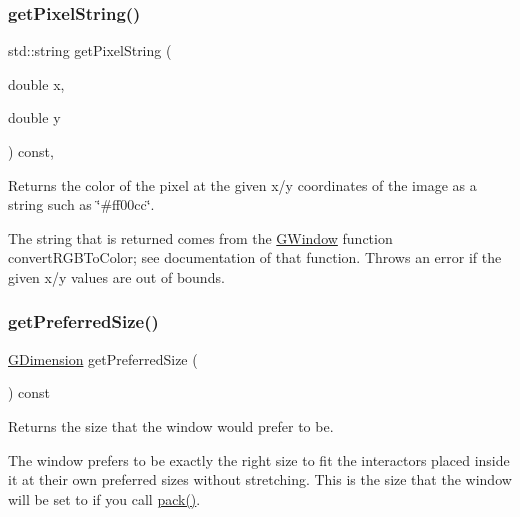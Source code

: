\mbox{\label{classGDrawingSurface_a8da04ef488ec5fa498fbbffaf50928fd}} 
\subsubsection{\texorpdfstring{get\+Pixel\+String()}{getPixelString()}}
{\footnotesize\ttfamily std\+::string get\+Pixel\+String (\begin{DoxyParamCaption}\item[{double}]{x,  }\item[{double}]{y }\end{DoxyParamCaption}) const\hspace{0.3cm}{\ttfamily [virtual]}, {\ttfamily [inherited]}}



Returns the color of the pixel at the given x/y coordinates of the image as a string such as \char`\"{}\#ff00cc\char`\"{}. 

The string that is returned comes from the {\ttfamily \mbox{\hyperlink{classGWindow}{G\+Window}}} function {\ttfamily convert\+R\+G\+B\+To\+Color}; see documentation of that function. Throws an error if the given x/y values are out of bounds. \mbox{\label{classGWindow_a4aabbee761d8e9116275401131b7ccd1}} 
\subsubsection{\texorpdfstring{get\+Preferred\+Size()}{getPreferredSize()}}
{\footnotesize\ttfamily \mbox{\hyperlink{classGDimension}{G\+Dimension}} get\+Preferred\+Size (\begin{DoxyParamCaption}{ }\end{DoxyParamCaption}) const\hspace{0.3cm}{\ttfamily [virtual]}}



Returns the size that the window would prefer to be. 

The window prefers to be exactly the right size to fit the interactors placed inside it at their own preferred sizes without stretching. This is the size that the window will be set to if you call \mbox{\hyperlink{classGWindow_a915ffc82b17862ab1d2a466a79d23a3f}{pack()}}. \mbox{\label{classGWindow_a164d248057318961e7f2abc8c3477d63}} 
